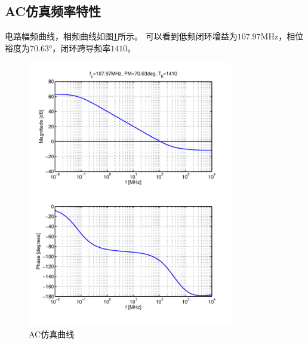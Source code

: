 \documentclass[a4paper]{article}
\newcommand{\uMHz}{\si{\mega\hertz}}
\newcommand{\udeg}{\si{\degree}}
\begin{document}
\subsection{AC仿真频率特性}
电路幅频曲线，相频曲线如图\ref{commonac}所示。
可以看到低频闭环增益为$107.97\uMHz$，相位裕度为$70.63\udeg$，闭环跨导频率$1410$。
\begin{figure}[htb]
    \begin{center}
        \includegraphics[width=0.8\textwidth]{common/ac.pdf}
    \end{center}
    \caption{AC仿真曲线}
    \label{commonac}
\end{figure}

\newpage
\clearpage
\end{document}
